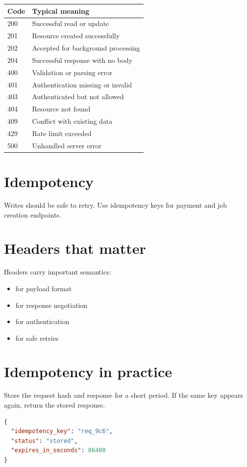 \begin{tabularx}{\textwidth}{@{}lX@{}}
\toprule
Code & Typical meaning \\
\midrule
200 & Successful read or update \\
201 & Resource created successfully \\
202 & Accepted for background processing \\
204 & Successful response with no body \\
400 & Validation or parsing error \\
401 & Authentication missing or invalid \\
403 & Authenticated but not allowed \\
404 & Resource not found \\
409 & Conflict with existing data \\
429 & Rate limit exceeded \\
500 & Unhandled server error \\
\bottomrule
\end{tabularx}

\section{Idempotency}
Writes should be safe to retry.
Use idempotency keys for payment and job creation endpoints.

\section{Headers that matter}
Headers carry important semantics:
\begin{itemize}[nosep]
  \item {} for payload format
  \item {} for response negotiation
  \item {} for authentication
  \item {} for safe retries
\end{itemize}

\section{Idempotency in practice}
Store the request hash and response for a short period.
If the same key appears again, return the stored response.

\begin{lstlisting}[language=JSON]
{
  "idempotency_key": "req_9c6",
  "status": "stored",
  "expires_in_seconds": 86400
}
\end{lstlisting}

